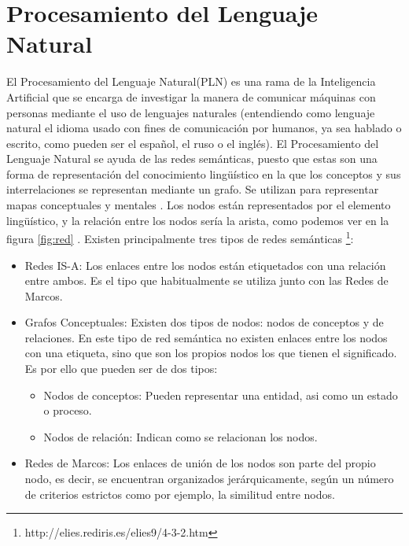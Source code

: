 \section{Procesamiento del Lenguaje Natural}
\label{cap:sec:lenguajenatural}
El Procesamiento del Lenguaje Natural(PLN) es una rama de la Inteligencia Artificial que se encarga de investigar la manera de comunicar máquinas con personas mediante el uso de lenguajes naturales (entendiendo como lenguaje natural el idioma usado con fines de comunicación por humanos, ya sea hablado o escrito, como pueden ser el español, el ruso o el inglés). 
El Procesamiento del Lenguaje Natural se ayuda de las redes semánticas, puesto que estas son una forma de representación del conocimiento lingüístico en la que los conceptos y sus interrelaciones se representan mediante un grafo. Se utilizan para representar mapas conceptuales y mentales \citep{wiki:redSemantica2018}.
Los nodos están representados por el elemento lingüístico, y  la relación entre los nodos sería la arista, como podemos ver en la figura  \ref{fig:red}
 	.
Existen principalmente tres tipos de redes semánticas \footnote{http://elies.rediris.es/elies9/4-3-2.htm}:
\begin{itemize}
	\item Redes IS-A: Los enlaces entre los nodos están etiquetados con una relación entre ambos. Es el tipo que habitualmente se utiliza junto con las Redes de Marcos.
	\item Grafos Conceptuales: Existen dos tipos de nodos: nodos de conceptos y de relaciones. En este tipo de red semántica no existen enlaces entre los nodos con una etiqueta, sino que son los propios nodos los que tienen el significado. Es por ello que pueden ser de dos tipos:
		\begin{itemize}
			\item Nodos de conceptos: Pueden representar una entidad, asi como un estado o proceso.
			\item Nodos de relación: Indican como se relacionan los nodos.			
		\end{itemize}
	\item Redes de Marcos: Los enlaces de unión de los nodos son parte del propio nodo, es decir, se encuentran organizados jerárquicamente, según un número de criterios estrictos como por ejemplo, la similitud entre nodos.
\end{itemize}

